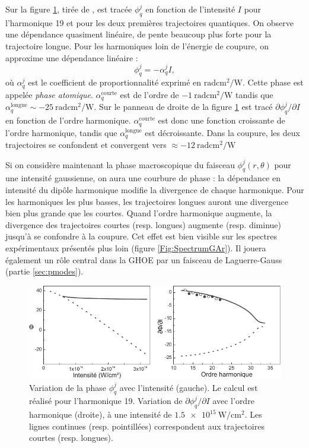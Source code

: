 Sur la figure \ref{fig:varju}, tirée de , est tracée $\phi^j_q$ en fonction de l'intensité $I$ pour l'harmonique 19 et pour les deux premières trajectoires quantiques. On observe une dépendance quasiment linéaire, de pente beaucoup plus forte pour la trajectoire longue. Pour les harmoniques loin de l'énergie de coupure, on approxime une dépendance linéaire :
\begin{equation}
\phi^j_q = - \alpha_q^j I,
\label{eq:alphaI}
\end{equation}
où $\alpha_q^j$ est le coefficient de proportionnalité exprimé en $\si{\radian\cm\squared\per\W}$. Cette phase est appelée \textit{phase atomique}. $\alpha_q^{\text{courte}}$ est de l'ordre de $\SI{-1}{\radian\cm\squared\per\W}$ tandis que $\alpha_q^{\text{longue}}\sim\SI{-25}{\radian\cm\squared\per\W}$. Sur le panneau de droite de la figure \ref{fig:varju} est tracé $\partial\phi^j_q/\partial I$ en fonction de l'ordre harmonique. $\alpha_q^{\text{courte}}$ est donc une fonction croissante de l'ordre harmonique, tandis que $\alpha_q^{\text{longue}}$ est décroissante. Dans la coupure, les deux trajectoires se confondent et convergent vers $\approx \SI{-12}{\radian\cm\squared\per\W}$\par
Si on considère maintenant la phase macroscopique du faisceau $\phi^j_q(r,\theta)$ pour une intensité gaussienne, on aura une courbure de phase : la dépendance en intensité du dipôle harmonique modifie la divergence de chaque harmonique. Pour les harmoniques les plus basses, les trajectoires longues auront une divergence bien plus grande que les courtes. Quand l'ordre harmonique augmente, la divergence des trajectoires courtes (resp. longues) augmente (resp. diminue) jusqu'à se confondre à la coupure. Cet effet est bien visible sur les spectres expérimentaux présentés plus loin (figure \ref{Fig:SpectrumGAr}). Il jouera également un rôle central dans la GHOE par un faisceau de Laguerre-Gauss (partie \ref{sec:pmodes}).

\begin{figure}[!ht]
\centering
\includegraphics[width=1\columnwidth]{Figures/ThreeStep/alphaI_varju.pdf}%
\caption{Variation de la phase $\phi^j_q$ avec l'intensité (gauche). Le calcul est réalisé pour l'harmonique 19. Variation de $\partial\phi^j_q/\partial I$ avec l'ordre harmonique (droite), à une intensité de $\SI{1.5e15}{\W\per\cm\squared}$. Les lignes continues (resp. pointillées) correspondent aux trajectoires courtes (resp. longues).}
\label{fig:varju}
\end{figure}

